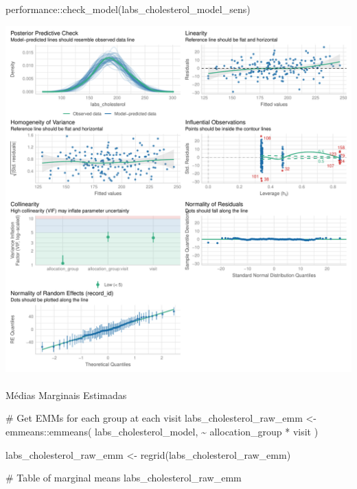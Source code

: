 \documentclass[
  letterpaper,
  DIV=11,
  numbers=noendperiod]{scrartcl}
\makeatletter
\let\oldparagraph\paragraph
\renewcommand{\paragraph}{
    \@ifstar
      \xxxParagraphStar
      \xxxParagraphNoStar
  }
\newcommand{\xxxParagraphStar}[1]{\oldparagraph*{#1}\mbox{}}
\newcommand{\xxxParagraphNoStar}[1]{\oldparagraph{#1}\mbox{}}
\newenvironment{Shaded}{\begin{snugshade}}{\end{snugshade}}
\newcommand{\CommentTok}[1]{\textcolor[rgb]{0.37,0.37,0.37}{#1}}
\newcommand{\FunctionTok}[1]{\textcolor[rgb]{0.28,0.35,0.67}{#1}}
\newcommand{\NormalTok}[1]{\textcolor[rgb]{0.00,0.23,0.31}{#1}}
\newcommand{\OtherTok}[1]{\textcolor[rgb]{0.00,0.23,0.31}{#1}}
\newcommand{\SpecialCharTok}[1]{\textcolor[rgb]{0.37,0.37,0.37}{#1}}
\makeatother
\begin{document}
\begin{Shaded}
\begin{Highlighting}[]
\NormalTok{performance}\SpecialCharTok{::}\FunctionTok{check\_model}\NormalTok{(labs\_cholesterol\_model\_sens)}
\end{Highlighting}
\end{Shaded}

\includegraphics{Outcomes_V1V2V3_files/figure-pdf/labs_cholesterol_4-2.pdf}

\paragraph{Médias Marginais
Estimadas}\label{muxe9dias-marginais-estimadas-4}

\begin{Shaded}
\begin{Highlighting}[]
\CommentTok{\# Get EMMs for each group at each visit}
\NormalTok{labs\_cholesterol\_raw\_emm }\OtherTok{\textless{}{-}}\NormalTok{ emmeans}\SpecialCharTok{::}\FunctionTok{emmeans}\NormalTok{(}
\NormalTok{    labs\_cholesterol\_model, }
    \SpecialCharTok{\textasciitilde{}}\NormalTok{ allocation\_group }\SpecialCharTok{*}\NormalTok{ visit}
\NormalTok{)}

\NormalTok{labs\_cholesterol\_raw\_emm }\OtherTok{\textless{}{-}} \FunctionTok{regrid}\NormalTok{(labs\_cholesterol\_raw\_emm)}

\CommentTok{\# Table of marginal means}
\NormalTok{labs\_cholesterol\_raw\_emm}
\end{Highlighting}
\end{Shaded}
\end{document}
